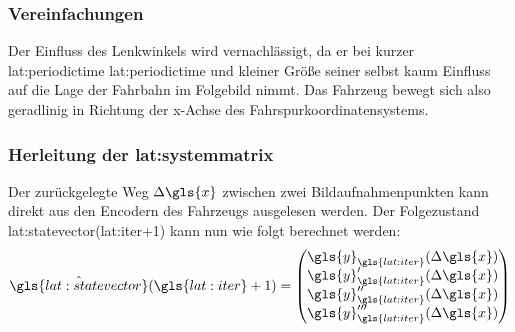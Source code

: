 \subsubsection{Vereinfachungen}
Der Einfluss des Lenkwinkels wird vernachlässigt, da er bei kurzer \glsdesc{lat:periodictime} \gls{lat:periodictime} und kleiner Größe seiner selbst kaum Einfluss auf die Lage der Fahrbahn im Folgebild nimmt. Das Fahrzeug bewegt sich also geradlinig in Richtung der x-Achse des Fahrspurkoordinatensystems. 

\subsubsection{Herleitung der \glsdesc{lat:systemmatrix}}
Der zurückgelegte Weg \begin{math} \Delta \gls{x} \end{math} zwischen zwei Bildaufnahmenpunkten kann direkt aus den Encodern des Fahrzeugs ausgelesen werden. Der Folgezustand  \gls{lat:statevector}(\gls{lat:iter}+1) kann nun wie folgt berechnet werden:
\begin{equation}
\label{eq:nextstatemapping}
\hat{\gls{lat:statevector}}(\gls{lat:iter}+1) =
\begin{pmatrix}
\gls{y}_{\gls{lat:iter}}(\Delta \gls{x}) \\
\gls{y}_{\gls{lat:iter}}^\prime(\Delta \gls{x}) \\
\gls{y}_{\gls{lat:iter}}^{\prime\prime}(\Delta \gls{x}) \\
\gls{y}_{\gls{lat:iter}}^{\prime\prime\prime}(\Delta \gls{x}) \\
\end{pmatrix}
\end{equation}

